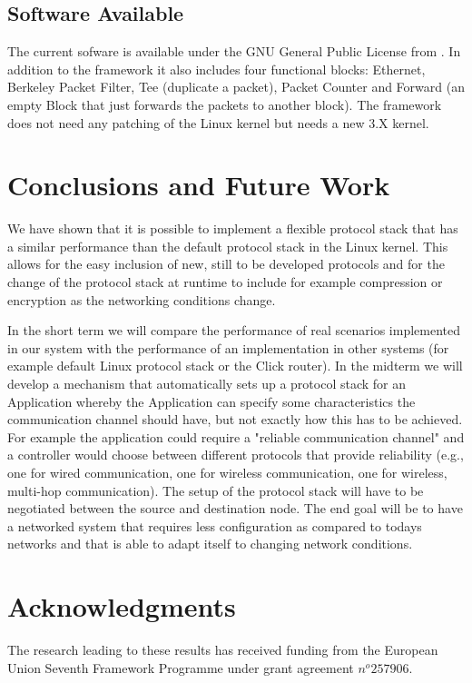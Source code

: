\documentclass{sig-alternate}
\begin{document}
\subsection{Software Available}
The current sofware is available under the GNU General Public License from 
\cite{lana}. In addition to the framework it also includes four functional 
blocks: Ethernet, Berkeley Packet Filter, Tee (duplicate a packet), Packet 
Counter and Forward (an empty Block that just forwards the packets to 
another block). The framework does not need any patching of the Linux kernel
but needs a new 3.X kernel.

\section{Conclusions and Future Work}
We have shown that it is possible to implement a flexible protocol stack that has a similar performance than the default protocol stack in the Linux kernel. This allows for the easy inclusion of new, still to be developed protocols and for the change of the protocol stack at runtime to include for example compression or encryption as the networking conditions change. 

In the short term we will compare the performance of real scenarios implemented in our system with the performance of an implementation in other systems (for example default Linux protocol stack or the Click router). In the midterm we will develop a mechanism that automatically sets up a protocol stack for an Application whereby the Application can specify some characteristics the communication channel should have, but not exactly how this has to be achieved. For example the application could require a "reliable communication channel" and a controller would choose between different protocols that provide reliability (e.g., one for wired communication, one for wireless communication, one for wireless, multi-hop communication). The setup of the protocol stack will have to be negotiated between the source and destination node. The end goal will be to have a networked system that requires less configuration as compared to todays networks and that is able to adapt itself to changing network conditions.   



\section{Acknowledgments}
The research leading to these results has received funding from the European Union Seventh Framework Programme under grant agreement $n^o 257906$.
%

%
%
\end{document}
